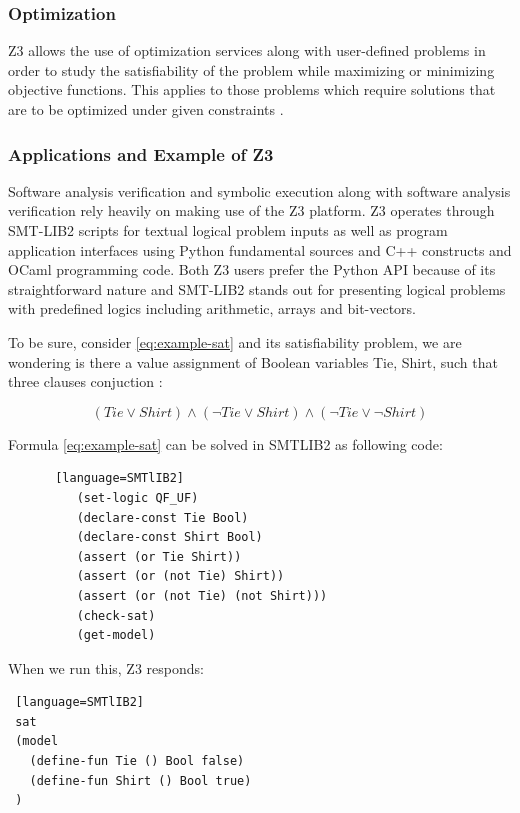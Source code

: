 \documentclass[]{rptuseminar}
\begin{document}
\subsubsection{Optimization}
Z3 allows the use of optimization services along with user-defined problems in order to study the satisfiability of the problem while maximizing or minimizing objective functions. This applies to those problems which require solutions that are to be optimized under given constraints \cite{nikolaj_bjorner_programming_nodate}.

\subsubsection{Applications and Example of Z3}
Software analysis verification and symbolic execution along with software analysis verification rely heavily on making use of the Z3 platform. Z3 operates through SMT-LIB2 scripts for textual logical problem inputs as well as program application interfaces using Python fundamental sources and C++ constructs and OCaml programming code. Both Z3 users prefer the Python API because of its straightforward nature and SMT-LIB2 stands out for presenting logical problems with predefined logics including arithmetic, arrays and bit-vectors.
\vspace{1em}

To be sure, consider \ref{eq:example-sat} and its satisfiability problem,
we are wondering is there a value assignment of Boolean variables Tie, Shirt,
such that three clauses conjuction :


\begin{equation}
  \label{eq:example-sat}
  (Tie \lor Shirt) \land (\lnot Tie \lor Shirt) \land (\lnot Tie \lor \lnot Shirt)
\end{equation}

Formula \ref{eq:example-sat}  can be solved in SMTLIB2 as following code:

\begin{figure}[ht]
  \begin{lstlisting} [language=SMTlIB2]
    (set-logic QF_UF)
    (declare-const Tie Bool)
    (declare-const Shirt Bool)
    (assert (or Tie Shirt))
    (assert (or (not Tie) Shirt))
    (assert (or (not Tie) (not Shirt)))
    (check-sat)
    (get-model)
  \end{lstlisting}
  \end{figure}

  When we run this, Z3 responds:
\begin{lstlisting} [language=SMTlIB2]
 sat
 (model
   (define-fun Tie () Bool false)
   (define-fun Shirt () Bool true)
 )
\end{lstlisting}
\vspace{1em}
\end{document}
